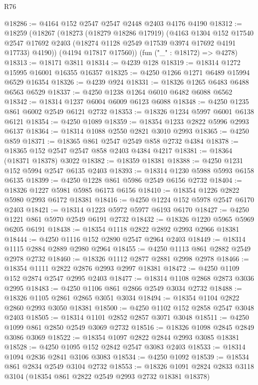 \begin{lexlean}{R76}
\begin{coremodule}
@18286 := @4164 @152 @2547 @2547 @2448 @2403 @4176 @4190
@18312 := @18259
    (@18267
      (@18273
        (@18279 @18286 @17919)
        (@4163
          @1304
          @152
          @17540
          @2547
          @17692
          @2403
          (@18274 @1128 @2549 @17539 @3974 @17692 @4191 @17733)
          @4190))
      (@4194 @17817 @17560))
    (fun ("_" : @18172) => @4278)
@18313 := @18171 @3811
@18314 := @4239 @128
@18319 := @18314 @1272 @15995 @16001 @16355 @16357
@18325 := @4250 @1266 @1271 @6489 @15994 @6529 @16354
@18326 := @4239 @924
@18331 := @18326 @1265 @6483 @6488 @6563 @6529
@18337 := @4250 @1238 @1264 @6010 @6482 @6088 @6562
@18342 := @18314 @1237 @6004 @6009 @6123 @6088
@18348 := @4250 @1235 @861 @6002 @2549 @6121 @2732
@18353 := @18326 @1234 @5997 @6001 @6138 @6121
@18354 := @4250 @1089
@18359 := @18354 @1233 @2822 @5996 @2993 @6137
@18364 := @18314 @1088 @2550 @2821 @3010 @2993
@18365 := @4250 @859
@18371 := @18365 @861 @2547 @2549 @858 @2732 @4384
@18378 := @18365 @152 @2547 @2547 @858 @2403 @4384 @4217
@18381 := @18364 (@18371 @18378) @3022
@18382 := @18359 @18381
@18388 := @4250 @1231 @152 @5994 @2547 @6135 @2403
@18393 := @18314 @1230 @5988 @5993 @6158 @6135
@18399 := @4250 @1228 @861 @5986 @2549 @6156 @2732
@18404 := @18326 @1227 @5981 @5985 @6173 @6156
@18410 := @18354 @1226 @2822 @5980 @2993 @6172 @18381
@18416 := @4250 @1224 @152 @5978 @2547 @6170 @2403
@18421 := @18314 @1223 @5972 @5977 @6193 @6170
@18427 := @4250 @1221 @861 @5970 @2549 @6191 @2732
@18432 := @18326 @1220 @5965 @5969 @6205 @6191
@18438 := @18354 @1118 @2822 @2892 @2993 @2966 @18381
@18444 := @4250 @1116 @152 @2890 @2547 @2964 @2403
@18449 := @18314 @1115 @2884 @2889 @2980 @2964
@18455 := @4250 @1113 @861 @2882 @2549 @2978 @2732
@18460 := @18326 @1112 @2877 @2881 @2998 @2978
@18466 := @18354 @1111 @2822 @2876 @2993 @2997 @18381
@18472 := @4250 @1109 @152 @2874 @2547 @2995 @2403
@18477 := @18314 @1108 @2868 @2873 @3036 @2995
@18483 := @4250 @1106 @861 @2866 @2549 @3034 @2732
@18488 := @18326 @1105 @2861 @2865 @3051 @3034
@18494 := @18354 @1104 @2822 @2860 @2993 @3050 @18381
@18500 := @4250 @1102 @152 @2858 @2547 @3048 @2403
@18505 := @18314 @1101 @2852 @2857 @3071 @3048
@18511 := @4250 @1099 @861 @2850 @2549 @3069 @2732
@18516 := @18326 @1098 @2845 @2849 @3086 @3069
@18522 := @18354 @1097 @2822 @2844 @2993 @3085 @18381
@18528 := @4250 @1095 @152 @2842 @2547 @3083 @2403
@18533 := @18314 @1094 @2836 @2841 @3106 @3083
@18534 := @4250 @1092
@18539 := @18534 @861 @2834 @2549 @3104 @2732
@18553 := @18326
    @1091
    @2824
    @2833
    @3118
    @3104
    (@18354 @861 @2822 @2549 @2993 @2732 @18381 @18378)

\end{coremodule}
\end{lexlean}
